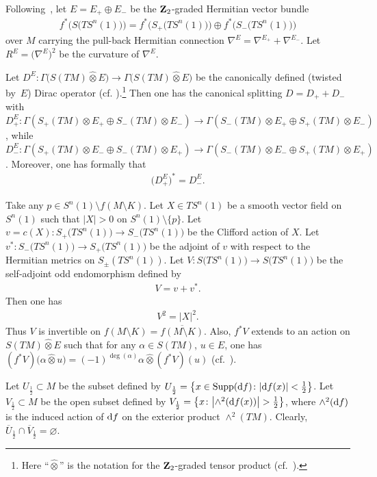\documentclass[pdftex]{sigma}
\numberwithin{equation}{section}
\theoremstyle{definition}
\begin{document}
Following~\cite{L98}, let $E=E_+\oplus E_-$ be the ${\bf Z}_2$-graded Hermitian vector bundle
\begin{gather}\label{1.4b}
f^*\big(S\big(TS^n(1)\big)\big)=f^*\big(S_+\big(TS^n(1)\big)\big)\oplus f^*\big(S_-\big(TS^n(1)\big)\big)
\end{gather}
over $M$ carrying the pull-back Hermitian connection $\nabla^E=\nabla^{E_+}+\nabla^{E_-}$. Let $R^E=\big(\nabla^E\big)^2$ be the curvature of $\nabla^E$.

Let $D^E\colon \Gamma\big(S(TM)\widehat\otimes E\big)\rightarrow
\Gamma\big(S(TM)\widehat\otimes E\big)$ be the canonically defined (twisted by~$E$) Dirac operator (cf. \cite{LaMi89}).\footnote{Here ``$\widehat\otimes$'' is the notation for the ${\bf Z}_2$-graded tensor product (cf.~\cite{Q85}).} Then one has the canonical splitting $D=D_++D_-$ with $D^E_+\colon \Gamma(S_+(TM) \otimes E_+\oplus S_-(TM)\otimes E_-) \rightarrow \Gamma(S_-(TM) \otimes E_+\oplus S_+(TM)\otimes E_-) $, while $D^E_-\colon \Gamma(S_+(TM) \otimes E_-\oplus S_-(TM)\otimes E_+) \rightarrow \Gamma(S_-(TM) \otimes E_-\oplus S_+(TM)\otimes E_+) $. Moreover, one has formally that
\begin{gather*}%
\big(D^E_+\big)^*=D^E_-.
\end{gather*}

 Take any $p\in S^n(1)\setminus {f(M\setminus K)}$. Let $X\in TS^n(1)$ be a smooth vector field on $S^n(1)$ such that $|X|>0$ on $S^n(1)\setminus \{p\}$. Let $v=c(X)\colon S_+\big(TS^n(1)\big)\rightarrow S_-\big(TS^n(1)\big)$ be the Clifford action of $X$. Let $v^*\colon S_-\big(TS^n(1)\big)\rightarrow S_+\big(TS^n(1)\big)$ be the adjoint of $v$ with respect to the Hermitian metrics on $S_\pm(TS^n(1))$. Let $V\colon S\big(TS^n(1)\big)\rightarrow S\big(TS^n(1)\big)$ be the self-adjoint odd endomorphism defined by
\begin{gather}\label{1.6}
V=v+v^*.
\end{gather}
Then one has
\begin{gather}\label{1.6a}V^2=|X|^2.
\end{gather}
Thus $V$ is invertible on $ {f(M\setminus K)} = \overline {f(M\setminus K)} $. Also, $f^*V$ extends to an action on $S(TM)\widehat\otimes E$ such that for any $\alpha\in S(TM)$, $u\in E$, one has $(f^*V )\big(\alpha\widehat \otimes u\big)=(-1)^{\deg (\alpha)}\alpha\widehat\otimes (f^*V)(u)$ (cf.~\cite{Q85}).

Let $U_{\frac{1}{2}}\subset M$ be the subset defined by
$U_{\frac{1}{2}}=\big\{ x\in \operatorname{Supp}({\rm d}f)\colon |{\rm d}f(x)|<\frac{1}{2}\big\}$. Let $V_{\frac{1}{2}}\subset M$ be the open subset defined by $V_{\frac{1}{2}}=\big\{ x \colon \big|{\wedge}^2({\rm d}f(x))\big|>\frac{1}{2}\big\}$, where $\wedge^2({\rm d}f)$ is the induced action of ${\rm d}f$ on the exterior product $\wedge^2(TM)$. Clearly, $\overline{U}_{\frac{1}{2}}\cap \overline{V}_{\frac{1}{2}}=\varnothing$.
\end{document}
